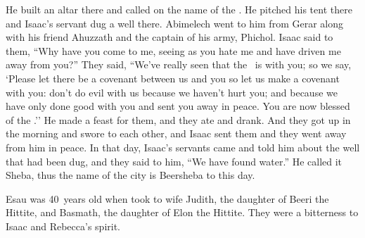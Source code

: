 \begin{inparaenum}
   He built an altar there and called on the name of the \lord. He pitched his tent there and Isaac's servant dug a well there.%
   Abimelech went to him from Gerar along with his friend Ahuzzath and the captain of his army, Phichol.%
   Isaac said to them, ``Why have you come to me, seeing as you hate me and have driven me away from you?''%
   They said, ``We've really seen that the \lord\ is with you; so we say, `Please let there be a covenant between us and you so let us make a covenant with you:%
   don't do evil with us because we haven't hurt you; and because we have only done good with you and sent you away in peace. You are now blessed of the \lord.''%
   He made a feast for them, and they ate and drank.%
   And they got up in the morning and swore to each other, and Isaac sent them and they went away from him in peace.%
   In that day, Isaac's servants came and told him about the well that had been dug, and they said to him, ``We have found water.''%
   He called it Sheba, thus the name of the city is Beersheba to this day.%
  
   Esau was 40~years old when took to wife Judith, the daughter of Beeri the Hittite, and Basmath, the daughter of Elon the Hittite.%
   They were a bitterness to Isaac and Rebecca's spirit.%
\end{inparaenum}
